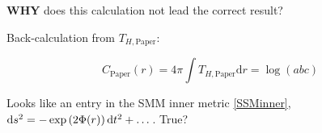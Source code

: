 \documentclass[12pt,a4paper]{article}
\begin{document}
{\bf WHY} does this calculation not lead the correct result?

Back-calculation from $T_{H,\text{Paper}}$:

\begin{equation}
C_\text{Paper}(r) = 4\pi \int T_{H,\text{Paper}} \mathrm{d}r = \log \left( abc \right)
\end{equation}

Looks like an entry in the SMM inner metric \ref{SSMinner}, $\mathrm{d} s^2 = - \exp \left( 2 \Phi(r) \right) \mathrm{d} t^2 + \dots$. True?




\end{document}

